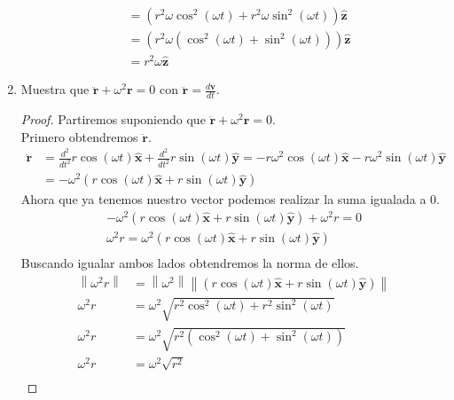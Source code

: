 \documentclass{article}
\newcommand{\norm}[1]{\left\lVert#1\right\rVert}
\begin{document}
\begin{enumerate}
\begin{equation*}
\begin{split}
            &=(r^2\omega\cos^2(\omega t) + r^2\omega\sin^2(\omega t))\pmb{\hat{z}}\\
            &=(r^2\omega(\cos^2(\omega t)+\sin^2(\omega t)))\pmb{\hat{z}}\\
            &=r^2\omega\pmb{\hat{z}}
        \end{split}
    \end{equation*}
    \item Muestra que $\pmb{\ddot{r}}+\omega^2 \pmb{r}=0$ con $\pmb{\ddot{r}}=\frac{d\pmb{v}}{dt}$.\\
    \begin{proof}
    Partiremos suponiendo que  $\pmb{\ddot{r}}+\omega^2 \pmb{r}=0$.\\
    Primero obtendremos $\pmb{\ddot{r}}$.
    \begin{equation*}
        \begin{split}
            \pmb{\ddot{r}}&=\frac{d^2}{dt^2}r\cos(\omega t)\pmb{\hat{x}} + \frac{d^2}{dt^2}r\sin(\omega t)\pmb{\hat{y}}=-r\omega^2\cos(\omega t)\pmb{\hat{x}}-r\omega^2\sin(\omega t)\pmb{\hat{y}}\\
            &=-\omega^2(r\cos(\omega t)\pmb{\hat{x}}+r\sin(\omega t)\pmb{\hat{y}})
        \end{split}
    \end{equation*}
    Ahora que ya tenemos nuestro vector podemos realizar la suma igualada a $0$.
    \begin{equation*}
        \begin{split}
            -\omega^2(r\cos(\omega t)\pmb{\hat{x}}+r\sin(\omega t)\pmb{\hat{y}})+\omega^2r=0\\
            \omega^2r=\omega^2(r\cos(\omega t)\pmb{\hat{x}}+r\sin(\omega t)\pmb{\hat{y}})\\
        \end{split}
    \end{equation*}
    Buscando igualar ambos lados obtendremos la norma de ellos.
    \begin{equation*}
        \begin{split}
            \norm{\omega^2r}&=\norm{\omega^2}\norm{(r\cos(\omega t)\pmb{\hat{x}}+r\sin(\omega t)\pmb{\hat{y}})}\\
            \omega^2r&=\omega^2\sqrt{r^2\cos^2(\omega t)+r^2\sin^2(\omega t)}\\
            \omega^2r&=\omega^2\sqrt{r^2(\cos^2(\omega t)+\sin^2(\omega t))}\\
            \omega^2r&=\omega^2\sqrt{r^2}\\

\end{split}
\end{equation*}
\end{proof}
\end{enumerate}
\end{document}
